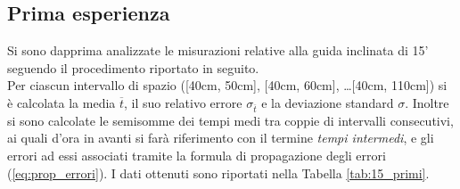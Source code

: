 \documentclass[a4paper,11pt,oneside]{article}
\begin{document}
\subsection{Prima esperienza}
Si sono dapprima analizzate le misurazioni relative alla guida inclinata di 15' seguendo il procedimento riportato in seguito.\\
Per ciascun intervallo di spazio ([40cm, 50cm], [40cm, 60cm], \dots [40cm, 110cm]) si è calcolata la media $\overline{t}$, il suo relativo errore $\sigma_{\overline{t}}$ e la deviazione standard $\sigma$. Inoltre si sono calcolate le semisomme dei tempi medi tra coppie di intervalli consecutivi, ai quali d'ora in avanti si farà riferimento con il termine \textit{tempi intermedi}, e gli errori ad essi associati tramite la formula di propagazione degli errori (\ref{eq:prop_errori}).
I dati ottenuti sono riportati nella Tabella \ref{tab:15_primi}.
\end{document}
